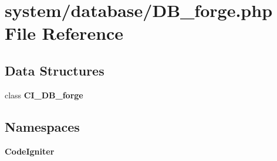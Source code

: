 \section{system/database/\-D\-B\-\_\-forge.php File Reference}
\label{_d_b__forge_8php}
\subsection*{Data Structures}
\begin{DoxyCompactItemize}
\item 
class {\bf C\-I\-\_\-\-D\-B\-\_\-forge}
\end{DoxyCompactItemize}
\subsection*{Namespaces}
\begin{DoxyCompactItemize}
\item 
{\bf Code\-Igniter}
\end{DoxyCompactItemize}
